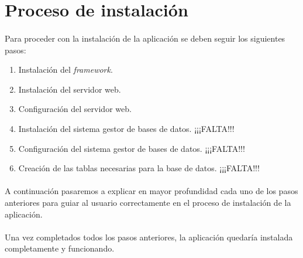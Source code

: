 \section{Proceso de instalación}\label{instalacion}

  \paragraph{}Para proceder con la instalación de la aplicación se deben seguir
  los siguientes pasos:

  \begin{enumerate}
   \item Instalación del \textit{framework}.
   \item Instalación del servidor web.
   \item Configuración del servidor web.
   \item Instalación del sistema gestor de bases de datos. ¡¡¡FALTA!!!
   \item Configuración del sistema gestor de bases de datos. ¡¡¡FALTA!!!
   \item Creación de las tablas necesarias para la base de datos. ¡¡¡FALTA!!!
  \end{enumerate}

  \paragraph{}A continuación pasaremos a explicar en mayor profundidad cada
  uno de los pasos anteriores para guiar al usuario correctamente en el proceso
  de instalación de la aplicación.

  \begin{enumerate}
    
    
    
  \end{enumerate}

  \paragraph{}Una vez completados todos los pasos anteriores, la aplicación
  quedaría instalada completamente y funcionando.